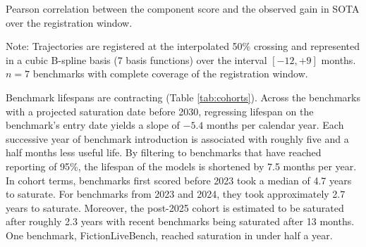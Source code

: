 \begin{table}[t]
\centering
\begin{threeparttable}
\caption{Functional principal component analysis of landmark-registered saturation trajectories.}
\label{tab:fpca}
\begin{tablenotes}
\footnotesize
\item[a] Pearson correlation between the component score and the observed gain in SOTA over the registration window.
\item Note: Trajectories are registered at the interpolated 50\% crossing and represented in a cubic B-spline basis (7 basis functions) over the interval $[-12, +9]$ months. $n = 7$ benchmarks with complete coverage of the registration window.
\end{tablenotes}
\end{threeparttable}
\end{table}

Benchmark lifespans are contracting (Table \ref{tab:cohorts}). Across the benchmarks with a projected saturation date before 2030, regressing lifespan on the benchmark's entry date yields a slope of $-5.4$ months per calendar year. Each successive year of benchmark introduction is associated with roughly five and a half months less useful life. By filtering to benchmarks that have reached reporting of 95\%, the lifespan of the models is shortened by 7.5 months per year. In cohort terms, benchmarks first scored before 2023 took a median of 4.7 years to saturate. For benchmarks from 2023 and 2024, they took approximately 2.7 years to saturate. Moreover, the post-2025 cohort is estimated to be saturated after roughly 2.3 years with recent benchmarks being saturated after 13 months. One benchmark, FictionLiveBench, reached saturation in under half a year.

